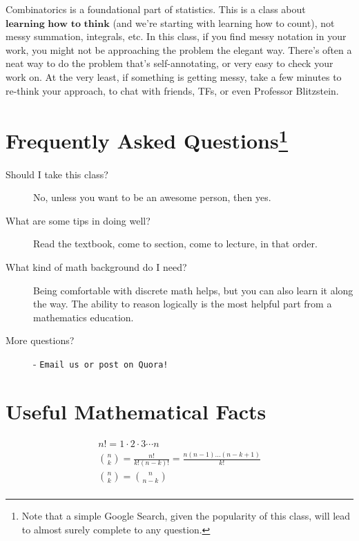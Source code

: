 \documentclass[11pt]{article}
\begin{document}
Combinatorics is a foundational part of statistics. This is a class about $\textbf{learning how to think}$ (and we're starting with learning how to count), not messy summation, integrals, etc. In this class, if you find messy notation in your work, you might not be approaching the problem the elegant way. There's often a neat way to do the problem that's self-annotating, or very easy to check your work on. At the very least, if something is getting messy, take a few minutes to re-think your approach, to chat with friends, TFs, or even Professor Blitzstein. \\

\section*{Frequently Asked Questions\footnote{Note that a simple Google Search, given the popularity of this class, will lead to almost surely complete to any question.}}

\begin{description}
\item[Should I take this class?] No, unless you want to be an awesome person, then yes.
\item[What are some tips in doing well?] Read the textbook, come to section, come to lecture, in that order.
\item[What kind of math background do I need?] Being comfortable with discrete math helps, but you can also learn it along the way. The ability to reason logically is the most helpful part from a mathematics education.
\item[More questions?] - \texttt{Email us or post on Quora!}
\end{description}

\section*{Useful Mathematical Facts}
\begin{align*}
n! = 1 \cdot 2 \cdot 3\cdots n \tag{0! = 1} \\
{n \choose k} = \frac{n!}{k!(n-k)!} = \frac{n(n-1)...(n-k+1)}{k!}\\
{n \choose k} = {n \choose n-k} \\
\end{align*}
\end{document}
